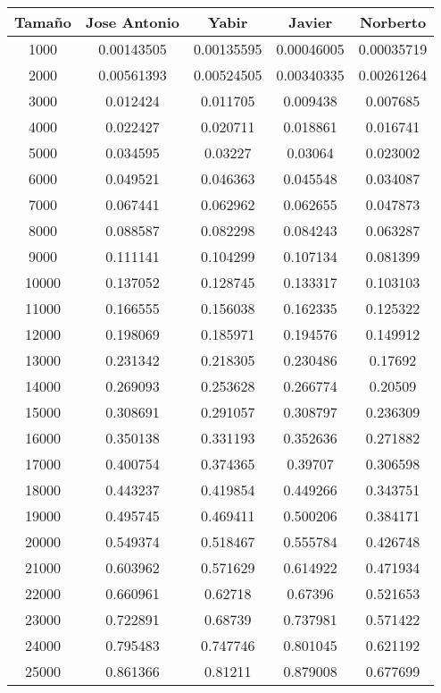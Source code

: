 \documentclass{article}
\begin{document}
\newpage
{}

\begin{tabular}{ | c | c  | c | c | c | }
  \hline
   Tama\~no & Jose Antonio & Yabir & Javier & Norberto\\ 
   \hline
1000	&	0.00143505	&	0.00135595	&	0.00046005	&	0.00035719	\\
2000	&	0.00561393	&	0.00524505	&	0.00340335	&	0.00261264	\\
3000	&	0.012424	&	0.011705	&	0.009438	&	0.007685	\\
4000	&	0.022427	&	0.020711	&	0.018861	&	0.016741	\\
5000	&	0.034595	&	0.03227	&	0.03064	&	0.023002	\\
6000	&	0.049521	&	0.046363	&	0.045548	&	0.034087	\\
7000	&	0.067441	&	0.062962	&	0.062655	&	0.047873	\\
8000	&	0.088587	&	0.082298	&	0.084243	&	0.063287	\\
9000	&	0.111141	&	0.104299	&	0.107134	&	0.081399	\\
10000	&	0.137052	&	0.128745	&	0.133317	&	0.103103	\\
11000	&	0.166555	&	0.156038	&	0.162335	&	0.125322	\\
12000	&	0.198069	&	0.185971	&	0.194576	&	0.149912	\\
13000	&	0.231342	&	0.218305	&	0.230486	&	0.17692	\\
14000	&	0.269093	&	0.253628	&	0.266774	&	0.20509	\\
15000	&	0.308691	&	0.291057	&	0.308797	&	0.236309	\\
16000	&	0.350138	&	0.331193	&	0.352636	&	0.271882	\\
17000	&	0.400754	&	0.374365	&	0.39707	&	0.306598	\\
18000	&	0.443237	&	0.419854	&	0.449266	&	0.343751	\\
19000	&	0.495745	&	0.469411	&	0.500206	&	0.384171	\\
20000	&	0.549374	&	0.518467	&	0.555784	&	0.426748	\\
21000	&	0.603962	&	0.571629	&	0.614922	&	0.471934	\\
22000	&	0.660961	&	0.62718	&	0.67396	&	0.521653	\\
23000	&	0.722891	&	0.68739	&	0.737981	&	0.571422	\\
24000	&	0.795483	&	0.747746	&	0.801045	&	0.621192	\\
25000	&	0.861366	&	0.81211	&	0.879008	&	0.677699	\\

  \hline
 \end{tabular}
 
\end{document}
